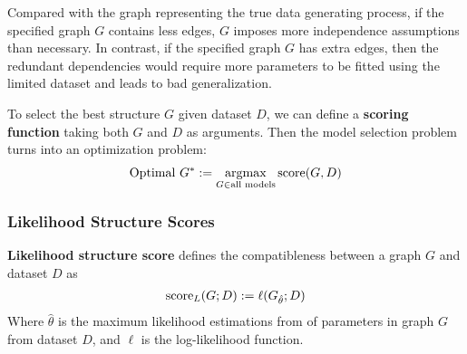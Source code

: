 \documentclass[11pt]{article}
\begin{document}
	 Compared with the graph representing the true data generating process, if the specified graph $G$ contains less edges, $G$ imposes more independence assumptions than necessary.
	 In contrast, if the specified graph $G$ has extra edges, then the redundant dependencies would require more parameters to be fitted using the limited dataset and leads to bad generalization.
	
	To select the best structure $G$ given dataset $D$, we can define a \textbf{scoring function} taking both $G$ and $D$ as arguments.
	Then the model selection problem turns into an optimization problem:
	\begin{align}
		\text{{Optimal }} G^* := \operatorname*{argmax}_{G \in \text{{all models}}} \text{{score}}(G, D)
	\end{align}

	\subsubsection{Likelihood Structure Scores}
	\begin{definition}
		\textbf{Likelihood structure score} defines the compatibleness between a graph $G$ and dataset $D$ as
		\begin{align}
			\text{{score}}_L (G; D) := \ell(G_{\hat{\theta}}; D)
		\end{align}
		Where $\hat{\theta}$ is the maximum likelihood estimations from of parameters in graph $G$ from dataset $D$, and $\ell$ is the log-likelihood function.
	\end{definition}
\end{document}
